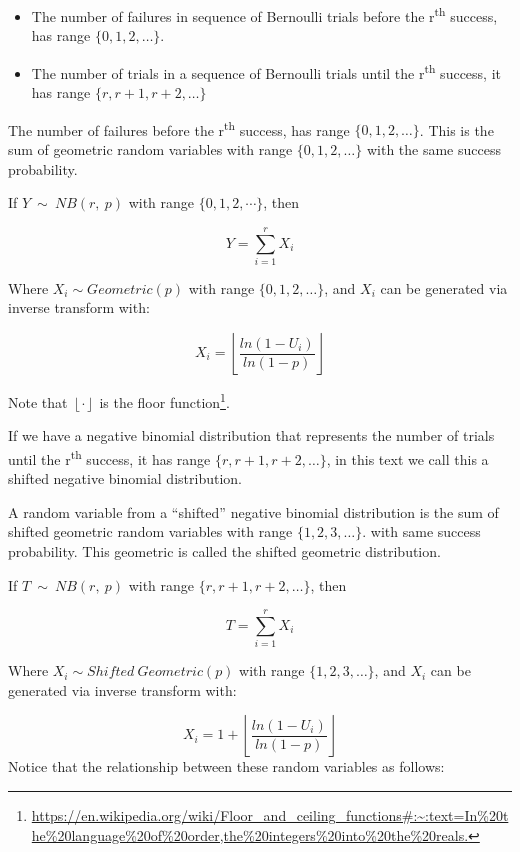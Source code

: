 \documentclass[
]{book}
\renewcommand{\href}[2]{#2\footnote{\url{#1}}}
\theoremstyle{definition}
\theoremstyle{definition}
\theoremstyle{definition}
\theoremstyle{definition}
\theoremstyle{remark}
\begin{document}
\begin{itemize}
\item
  The number of failures in sequence of Bernoulli trials before the
  r\textsuperscript{th} success, has range \(\{0, 1, 2, \dots\}\).
\item
  The number of trials in a sequence of Bernoulli trials until the
  r\textsuperscript{th} success, it has range \(\{r, r+1, r+2, \dots\}\)
\end{itemize}

The number of failures before the r\textsuperscript{th} success, has range \(\{0, 1, 2, \dots\}\). This is the sum of geometric random variables with range \(\{0, 1, 2, \dots\}\) with the same success probability.

If \(Y\ \sim\ NB(r,\ p)\) with range \(\{0, 1, 2, \cdots\}\), then

\[Y = \sum_{i = 1}^{r}X_{i}\]

Where \(X_{i}\sim Geometric(p)\) with range \(\{0, 1, 2, \dots\}\), and \(X_{i}\)
can be generated via inverse transform with:

\[X_{i} = \left\lfloor \frac{ln(1 - U_{i})}{ln(1 - p)} \right\rfloor\]

Note that \(\left\lfloor \cdot \right\rfloor\) is the \href{https://en.wikipedia.org/wiki/Floor_and_ceiling_functions\#:~:text=In\%20the\%20language\%20of\%20order,the\%20integers\%20into\%20the\%20reals.}{floor
function}.

If we have a negative binomial distribution that represents the number
of trials until the r\textsuperscript{th} success, it has range \(\{r, r+1, r+2, \dots\}\), in
this text we call this a shifted negative binomial distribution.

A random variable from a ``shifted'' negative binomial distribution is the
sum of shifted geometric random variables with range \(\{1, 2, 3, \dots\}\).
with same success probability. This geometric is called the shifted
geometric distribution.

If \(T\ \sim\ NB(r,\ p)\) with range \(\{r, r+1, r+2, \dots\}\), then

\[T = \sum_{i = 1}^{r}X_{i}\]

Where \(X_{i}\sim Shifted\ Geometric(p)\) with range \(\{1, 2, 3, \dots\}\), and
\(X_{i}\) can be generated via inverse transform with:

\[X_{i} = 1 + \left\lfloor \frac{ln(1 - U_{i})}{ln(1 - p)} \right\rfloor\]
Notice that the relationship between these random variables as follows:
\end{document}
